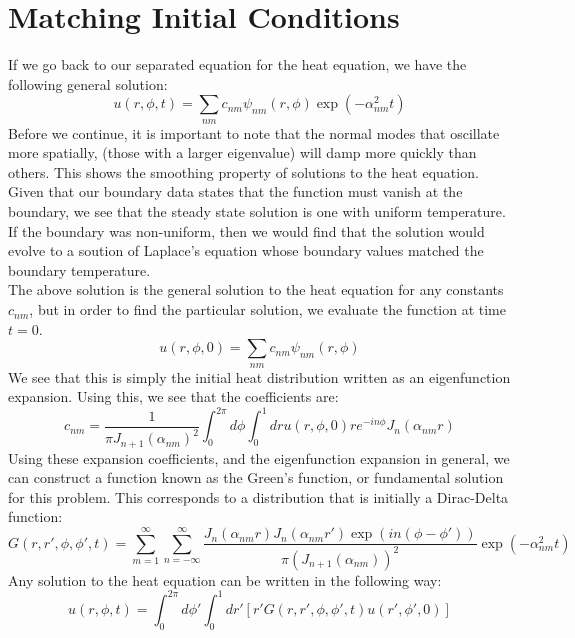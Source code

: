 \documentclass{article}
\begin{document}
\section{Matching Initial Conditions}
If we go back to our separated equation for the heat equation, we have the following general solution:
\begin{equation}
  u(r,\phi,t) = \sum_{nm} c_{nm} \psi_{nm}(r,\phi) \exp(-\alpha_{nm}^2 t)
\end{equation}
Before we continue, it is important to note that the normal modes that oscillate more spatially, (those with a larger eigenvalue) will damp more quickly than others. This shows the smoothing property of solutions to the heat equation. Given that our boundary data states that the function must vanish at the boundary, we see that the steady state solution is one with uniform temperature. If the boundary was non-uniform, then we would find that the solution would evolve to a soution of Laplace's equation whose boundary values matched the boundary temperature.\\
The above solution is the general solution to the heat equation for any constants $c_{nm}$, but in order to find the particular solution, we evaluate the function at time $t=0$.
\begin{equation}
  u(r,\phi,0) = \sum_{nm} c_{nm} \psi_{nm}(r,\phi) 
\end{equation}
We see that this is simply the initial heat distribution written as an eigenfunction expansion. Using this, we see that the coefficients are:
\begin{equation}
  c_{nm} = \frac{1}{\pi J_{n+1}(\alpha_{nm})^2}\int_0^{2\pi} d\phi\int_0^1 dr u(r,\phi,0) r e^{- i n \phi}J_n(\alpha_{nm} r)
\end{equation}
Using these expansion coefficients, and the eigenfunction expansion in general, we can construct a function known as the Green's function, or fundamental solution for this problem. This corresponds to a distribution that is initially a Dirac-Delta function:
\begin{equation}
  \boxed{
    \boxed{
      G(r,r',\phi,\phi',t) = \sum_{m = 1}^\infty \sum_{n = -\infty} ^\infty 
      \frac{J_n(\alpha_{nm} r) J_n(\alpha_{nm} r') \exp\left(i n(\phi - \phi')\right) }{\pi \left(J_{n+1}(\alpha_{nm})\right)^2}\exp\left(-\alpha_{nm}^2 t\right)
    }
  }
\end{equation}
Any solution to the heat equation can be written in the following way:
\begin{equation}
  u(r,\phi,t) = \int_0^{2\pi} d\phi' \int_0^1 dr' \left[r' G(r,r',\phi,\phi',t) u(r',\phi',0) \right]
\end{equation}
\end{document}
